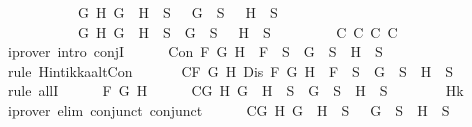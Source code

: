 \begin{isabellebody}
\ \ \ \ \ \ \ \ \ \ {\isasymand}\ {\isacharparenleft}{\isasymforall}G\ H{\isachardot}\ \isactrlbold {\isasymnot}{\isacharparenleft}G\ \isactrlbold {\isasymor}\ H{\isacharparenright}\ {\isasymin}\ S\ {\isasymlongrightarrow}\ \isactrlbold {\isasymnot}\ G\ {\isasymin}\ S\ {\isasymand}\ \isactrlbold {\isasymnot}\ H\ {\isasymin}\ S{\isacharparenright}\isanewline
\ \ \ \ \ \ \ \ \ \ {\isasymand}\ {\isacharparenleft}{\isasymforall}G\ H{\isachardot}\ \isactrlbold {\isasymnot}{\isacharparenleft}G\ \isactrlbold {\isasymrightarrow}\ H{\isacharparenright}\ {\isasymin}\ S\ {\isasymlongrightarrow}\ G\ {\isasymin}\ S\ {\isasymand}\ \isactrlbold {\isasymnot}\ H\ {\isasymin}\ S{\isacharparenright}{\isachardoublequoteclose}\ \isanewline
\ \ \ \ \ \ \isamarkupfalse%
\ C{}{}\ C{}{}\ C{}{}\ C{}{}\ \isamarkupfalse%
\ {\isacharparenleft}iprover\ intro{\isacharcolon}\ conjI{\isacharparenright}\isanewline
\ \ \ \ \isamarkupfalse%
\ {\isachardoublequoteopen}Con\ F\ G\ H\ {\isasymlongrightarrow}\ F\ {\isasymin}\ S\ {\isasymlongrightarrow}\ G\ {\isasymin}\ S\ {\isasymand}\ H\ {\isasymin}\ S{\isachardoublequoteclose}\isanewline
\ \ \ \ \ \ \isamarkupfalse%
\ {\isacharparenleft}rule\ Hintikka{\isacharunderscore}alt{}Con{\isacharparenright}\isanewline
\ \ \isamarkupfalse%
\isanewline
\ \ \isamarkupfalse%
\ C{}{\isacharcolon}{\isachardoublequoteopen}{\isasymforall}F\ G\ H{\isachardot}\ Dis\ F\ G\ H\ {\isasymlongrightarrow}\ F\ {\isasymin}\ S\ {\isasymlongrightarrow}\ G\ {\isasymin}\ S\ {\isasymor}\ H\ {\isasymin}\ S{\isachardoublequoteclose}\isanewline
\ \ \isamarkupfalse%
\ {\isacharparenleft}rule\ allI{\isacharparenright}{\isacharplus}\isanewline
\ \ \ \ \isamarkupfalse%
\ F\ G\ H\isanewline
\ \ \ \ \isamarkupfalse%
\ C{}{}{\isacharcolon}{\isachardoublequoteopen}{\isasymforall}G\ H{\isachardot}\ G\ \isactrlbold {\isasymor}\ H\ {\isasymin}\ S\ {\isasymlongrightarrow}\ G\ {\isasymin}\ S\ {\isasymor}\ H\ {\isasymin}\ S{\isachardoublequoteclose}\isanewline
\ \ \ \ \ \ \isamarkupfalse%
\ Hk\ \isamarkupfalse%
\ {\isacharparenleft}iprover\ elim{\isacharcolon}\ conjunct{}\ conjunct{}{\isacharparenright}\isanewline
\ \ \ \ \isamarkupfalse%
\ C{}{}{\isacharcolon}{\isachardoublequoteopen}{\isasymforall}G\ H{\isachardot}\ G\ \isactrlbold {\isasymrightarrow}\ H\ {\isasymin}\ S\ {\isasymlongrightarrow}\ \isactrlbold {\isasymnot}\ G\ {\isasymin}\ S\ {\isasymor}\ H\ {\isasymin}\ S{\isachardoublequoteclose}\isanewline

\end{isabellebody}

